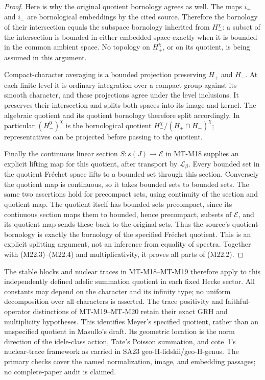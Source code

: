 \begin{proof}
Here is why the original quotient bornology
agrees as well.  The maps \(i_+\) and \(i_-\)
are bornological embeddings by the cited
source.  Therefore the bornology of their
intersection equals the subspace bornology
inherited from \(H_-^\chi\): a subset of the
intersection is bounded in either embedded
space exactly when it is bounded in the
common ambient space.  No topology on
\(H_+^\chi\), or on its quotient, is being
assumed in this argument.

Compact-character averaging is a bounded
projection preserving \(H_+\) and \(H_-\).
At each finite level it is ordinary integration
over a compact group against its smooth
character, and these projections agree under
the level inclusions.
It preserves their intersection and splits
both spaces into its image and kernel.
The algebraic quotient and its quotient
bornology therefore split accordingly.
In particular \((H_-^0)^\chi\) is the
bornological quotient
\(H_-^\chi/(H_+\cap H_-)^\chi\);
representatives can be projected before
passing to the quotient.

Finally the continuous linear section
\(S:s(J)\to\mathcal E\) in MT-M18 supplies
an explicit lifting map for this quotient,
after transport by \(\mathcal L_\beta\).
Every bounded set in the quotient
Fr\'echet space lifts to a bounded set
through this section.  Conversely the
quotient map is continuous, so it takes
bounded sets to bounded sets.
The same two assertions hold for
precompact sets, using continuity of
the section and quotient map.
The quotient itself has bounded sets
precompact, since its continuous section
maps them to bounded, hence precompact,
subsets of \(\mathcal E\), and its
quotient map sends these back to the
original sets.
Thus the source's quotient bornology
is exactly the bornology of the specified
Fr\'echet quotient.  This is an explicit
splitting argument, not an inference
from equality of spectra.
Together with (M22.3)--(M22.4) and
multiplicativity, it proves all parts
of (M22.2).
\end{proof}

The stable blocks and nuclear traces in
MT-M18--MT-M19 therefore apply to this
independently defined adelic summation
quotient in each fixed Hecke sector.
All constants may depend on the character
and its infinity type; no uniform
decomposition over all characters is
asserted.  The trace positivity and
faithful-operator distinctions of
MT-M19--MT-M20 retain their exact GRH
and multiplicity hypotheses.
This identifies Meyer's specified
quotient, rather than an unspecified
quotient in Masullo's draft.
Its geometric location is the norm
direction of the idele-class action,
Tate's Poisson summation, and cote~1's
nuclear-trace framework as carried in
SA23 geo-H-lidskii/geo-H-genus.
The primary checks cover the named
normalization, image, and embedding
passages; no complete-paper audit
is claimed.

